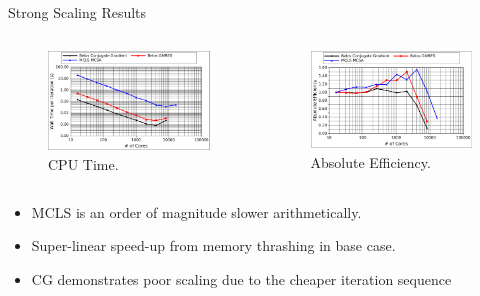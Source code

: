 \documentclass{beamer}
\begin{document}
\begin{frame}{Strong Scaling Results}

  \begin{columns}

    \begin{column}{0.5\textwidth}

      \begin{figure}[htpb!]
        \begin{center}
          \includegraphics[width=2.4in]{titan_pure_strong_time.pdf}
        \end{center}
        \caption{CPU Time.}
      \end{figure}

    \end{column}

    \begin{column}{0.5\textwidth}

      \begin{figure}[htpb!]
        \begin{center}
          \includegraphics[width=2.4in]{titan_pure_strong.pdf}
        \end{center}
        \caption{Absolute Efficiency.}
      \end{figure}

    \end{column}

  \end{columns}

  \begin{itemize}
  \item MCLS is an order of magnitude slower arithmetically.
  \item Super-linear speed-up from memory thrashing in base case.
  \item CG demonstrates poor scaling due to the cheaper iteration
    sequence
  \end{itemize}

\end{frame}
\end{document}
